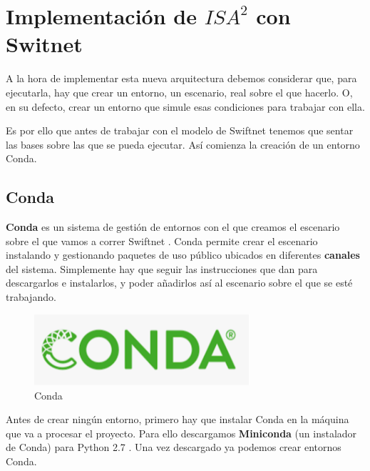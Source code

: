 \chapter{Implementación de $ISA^{2}$ con Switnet}


A la hora de implementar esta nueva arquitectura debemos considerar que, para ejecutarla, hay que crear un entorno, un escenario, real sobre el que hacerlo. O, en su defecto, crear un entorno que simule esas condiciones para trabajar con ella.

Es por ello que antes de trabajar con el modelo de Swiftnet \cite{swiftnet} tenemos que sentar las bases sobre las que se pueda ejecutar. Así comienza la creación de un entorno Conda.

\section{Conda}

\textbf{Conda} \cite{conda} es un sistema de gestión de entornos con el que creamos el escenario sobre el que vamos a correr Swiftnet \cite{swiftnet}. Conda permite crear el escenario instalando y gestionando paquetes de uso público ubicados en diferentes \textbf{canales} del sistema. Simplemente hay que seguir las instrucciones que dan para descargarlos e instalarlos, y poder añadirlos así al escenario sobre el que se esté trabajando.

\begin{figure}[H]
  \centering
  \includegraphics[width=8cm]{Figuras/Conda.eps}
  \caption{Conda}
\end{figure}

Antes de crear ningún entorno, primero hay que instalar Conda en la máquina que va a procesar el proyecto. Para ello descargamos \textbf{Miniconda} (un instalador de Conda) para Python 2.7 \cite{miniconda_install}. Una vez descargado ya podemos crear entornos Conda.


